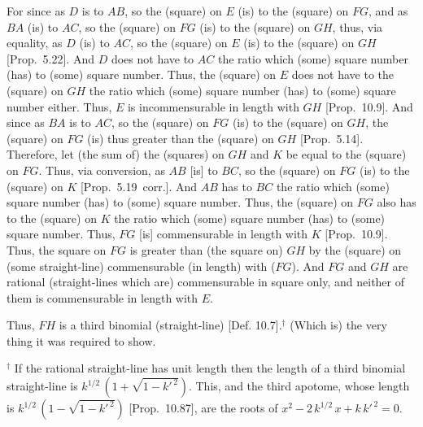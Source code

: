 \begin{Parallel}{}{}
{For since as $D$ is to $AB$, so the (square) on $E$ (is) to the (square)
on $FG$, and as $BA$ (is) to $AC$, so the (square) on $FG$ (is) to
the (square) on $GH$, thus, via equality, as $D$ (is) to $AC$, so the
(square) on $E$ (is) to the (square) on $GH$ [Prop.~5.22]. And $D$ does not have to $AC$ the
ratio which (some) square number (has) to (some) square number.
Thus, the (square) on $E$ does not have to the (square) on $GH$ the ratio
which (some) square number (has) to (some) square number either.
Thus, $E$ is incommensurable in length with $GH$ [Prop.~10.9].  And since as $BA$ is to $AC$,
so the (square) on $FG$ (is) to the (square) on $GH$, the (square) on 
$FG$ (is) thus greater than the (square) on $GH$ [Prop.~5.14]. Therefore, let (the sum of) the (squares)
on $GH$ and $K$
be equal to the (square) on $FG$. Thus, via
conversion, as $AB$ [is] to $BC$, so the (square) on $FG$ (is) to the
(square) on $K$ [Prop.~5.19~corr.]. And $AB$
has to $BC$ the ratio which (some) square number (has) to (some) square
number. Thus, the (square) on $FG$ also has to the (square) on $K$
the ratio which (some) square number (has) to (some) square number.
Thus,  $FG$ [is] commensurable in length with $K$ [Prop.~10.9]. Thus, the square on
$FG$ is greater than (the square on) $GH$ by the (square) on
(some straight-line) commensurable (in length) with ($FG$). And $FG$ and $GH$
are rational (straight-lines which are) commensurable in square only,
and neither of them is commensurable in length with $E$.

Thus, $FH$ is a third binomial (straight-line) [Def. 10.7].$^\dag$ (Which is) the very thing it
was required to show.}
\end{Parallel}
{\footnotesize\noindent$^\dag$ If the rational straight-line has unit length then the length of a third binomial straight-line
is  $k^{1/2}\,(1+\sqrt{1-k'^{\,2}})$. This, and the third apotome,
whose length is $k^{1/2}\,(1-\sqrt{1-k'^{\,2}})$ [Prop.~10.87],
are the roots of $x^2- 2\,k^{1/2}\,x+k\,k'^{\,2}=0$.}

